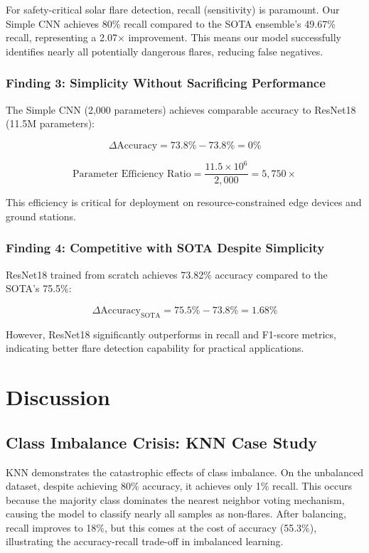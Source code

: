 \documentclass[11pt,a4paper]{article}
\begin{document}
For safety-critical solar flare detection, recall (sensitivity) is paramount. Our Simple CNN achieves 80\% recall compared to the SOTA ensemble's 49.67\% recall, representing a 2.07× improvement. This means our model successfully identifies nearly all potentially dangerous flares, reducing false negatives.

\subsubsection{Finding 3: Simplicity Without Sacrificing Performance}

The Simple CNN (2,000 parameters) achieves comparable accuracy to ResNet18 (11.5M parameters):

\[
\Delta \text{Accuracy} = 73.8\% - 73.8\% = 0\%
\]

\[
\text{Parameter Efficiency Ratio} = \frac{11.5 \times 10^6}{2,000} = 5,750\times
\]

This efficiency is critical for deployment on resource-constrained edge devices and ground stations.

\subsubsection{Finding 4: Competitive with SOTA Despite Simplicity}

ResNet18 trained from scratch achieves 73.82\% accuracy compared to the SOTA's 75.5\%:

\[
\Delta \text{Accuracy}_{\text{SOTA}} = 75.5\% - 73.8\% = 1.68\%
\]

However, ResNet18 significantly outperforms in recall and F1-score metrics, indicating better flare detection capability for practical applications.

\section{Discussion}

\subsection{Class Imbalance Crisis: KNN Case Study}

KNN demonstrates the catastrophic effects of class imbalance. On the unbalanced dataset, despite achieving 80\% accuracy, it achieves only 1\% recall. This occurs because the majority class dominates the nearest neighbor voting mechanism, causing the model to classify nearly all samples as non-flares. After balancing, recall improves to 18\%, but this comes at the cost of accuracy (55.3\%), illustrating the accuracy-recall trade-off in imbalanced learning.
\end{document}
